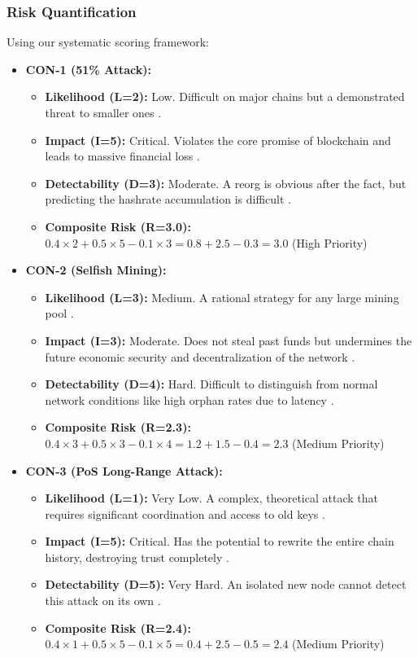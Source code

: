 \subsubsection{Risk Quantification}

Using our systematic scoring framework:

\begin{itemize}
    \item \textbf{CON-1 (51\% Attack):}
    \begin{itemize}
        \item \textbf{Likelihood (L=2):} Low. Difficult on major chains but a demonstrated threat to smaller ones \cite{eyal2014, casino2019}.
        \item \textbf{Impact (I=5):} Critical. Violates the core promise of blockchain and leads to massive financial loss \cite{casino2019}.
        \item \textbf{Detectability (D=3):} Moderate. A reorg is obvious after the fact, but predicting the hashrate accumulation is difficult \cite{wang2019}.
        \item \textbf{Composite Risk (R=3.0):} $0.4 \times 2 + 0.5 \times 5 - 0.1 \times 3 = 0.8 + 2.5 - 0.3 = 3.0$ (High Priority)
    \end{itemize}
    
    \item \textbf{CON-2 (Selfish Mining):}
    \begin{itemize}
        \item \textbf{Likelihood (L=3):} Medium. A rational strategy for any large mining pool \cite{eyal2014}.
        \item \textbf{Impact (I=3):} Moderate. Does not steal past funds but undermines the future economic security and decentralization of the network \cite{eyal2014, wang2019}.
        \item \textbf{Detectability (D=4):} Hard. Difficult to distinguish from normal network conditions like high orphan rates due to latency \cite{wang2019}.
        \item \textbf{Composite Risk (R=2.3):} $0.4 \times 3 + 0.5 \times 3 - 0.1 \times 4 = 1.2 + 1.5 - 0.4 = 2.3$ (Medium Priority)
    \end{itemize}

    \item \textbf{CON-3 (PoS Long-Range Attack):}
    \begin{itemize}
        \item \textbf{Likelihood (L=1):} Very Low. A complex, theoretical attack that requires significant coordination and access to old keys \cite{wang2019}.
        \item \textbf{Impact (I=5):} Critical. Has the potential to rewrite the entire chain history, destroying trust completely \cite{wang2019}.
        \item \textbf{Detectability (D=5):} Very Hard. An isolated new node cannot detect this attack on its own \cite{wang2019}.
        \item \textbf{Composite Risk (R=2.4):} $0.4 \times 1 + 0.5 \times 5 - 0.1 \times 5 = 0.4 + 2.5 - 0.5 = 2.4$ (Medium Priority)
    \end{itemize}


\end{itemize}
